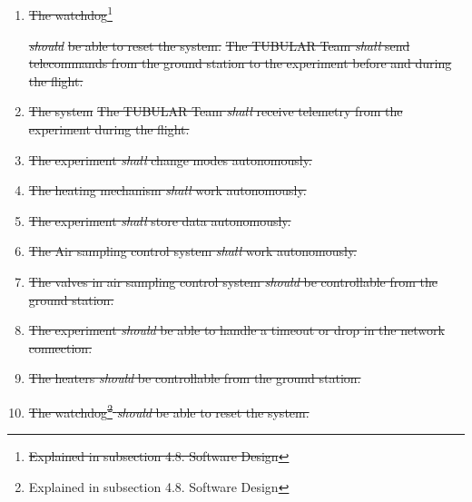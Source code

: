 \documentclass[a4paper,12pt,twoside]{article}
\providecommand{\DIFaddtex}[1]{{\protect\color{blue}\uwave{#1}}} %
\providecommand{\DIFdeltex}[1]{{\protect\color{red}\sout{#1}}}                      %
\providecommand{\DIFaddbegin}{} %
\providecommand{\DIFaddend}{} %
\providecommand{\DIFdelbegin}{} %
\providecommand{\DIFdelend}{} %
\providecommand{\DIFadd}[1]{\texorpdfstring{\DIFaddtex{#1}}{#1}} %
\providecommand{\DIFdel}[1]{\texorpdfstring{\DIFdeltex{#1}}{}} %
\newcommand{\DIFscaledelfig}{0.5}
\newlength{\DIFdelgraphicswidth} %
\newlength{\DIFdelgraphicsheight} %
\newcommand{\DIFaddincludegraphics}[2][]{{\color{blue}\fbox{\DIFOincludegraphics[#1]{#2}}}} %
\newcommand{\DIFdelincludegraphics}[2][]{%
\sbox{\DIFdelgraphicsbox}{\DIFOincludegraphics[#1]{#2}}%
\settoboxwidth{\DIFdelgraphicswidth}{\DIFdelgraphicsbox} %
\settoboxtotalheight{\DIFdelgraphicsheight}{\DIFdelgraphicsbox} %
\scalebox{\DIFscaledelfig}{%
\parbox[b]{\DIFdelgraphicswidth}{\usebox{\DIFdelgraphicsbox}\\[-\baselineskip] \rule{\DIFdelgraphicswidth}{0em}}\llap{\resizebox{\DIFdelgraphicswidth}{\DIFdelgraphicsheight}{%
\setlength{\unitlength}{\DIFdelgraphicswidth}%
\begin{picture}(1,1)%
\thicklines\linethickness{2pt} %
{\color[rgb]{1,0,0}\put(0,0){\framebox(1,1){}}}%
{\color[rgb]{1,0,0}\put(0,0){\line( 1,1){1}}}%
{\color[rgb]{1,0,0}\put(0,1){\line(1,-1){1}}}%
\end{picture}%
}\hspace*{3pt}}} %
} %
\DeclareRobustCommand{\DIFaddbegin}{\DIFOaddbegin \let\includegraphics\DIFaddincludegraphics} %
\DeclareRobustCommand{\DIFaddend}{\DIFOaddend \let\includegraphics\DIFOincludegraphics} %
\DeclareRobustCommand{\DIFdelbegin}{\DIFOdelbegin \let\includegraphics\DIFdelincludegraphics} %
\DeclareRobustCommand{\DIFdelend}{\DIFOaddend \let\includegraphics\DIFOincludegraphics} %
\begin{document}
\subsection{\DIFadd{Operational Requirements}}

\begin{enumerate}[label=O.\arabic*]
    \DIFaddend \item \DIFdelbegin \DIFdel{The watchdog}\footnote{\DIFdel{Explained in subsection 4.8. Software Design}} %
\addtocounter{footnote}{-1}%
\textit{\DIFdel{should}} %
\DIFdel{be able to reset the system.
    }\DIFdelend \DIFaddbegin \st{The TUBULAR Team \textit{shall} send telecommands from the ground station to the experiment before and during the flight.}\DIFadd{\textsuperscript{\ref{fn:unnecessary-requirement}}
    }\DIFaddend \item \DIFdelbegin \DIFdel{The system }\DIFdelend \DIFaddbegin \st{The TUBULAR Team \textit{shall} receive telemetry from the experiment during the flight.}\DIFadd{\textsuperscript{\ref{fn:unnecessary-requirement}}
    }\item \st{The experiment \textit{shall} change modes autonomously.}\DIFadd{\textsuperscript{\ref{fn:unnecessary-requirement}}
    }\item \st{The heating mechanism \textit{shall} work autonomously.}\DIFadd{\textsuperscript{\ref{fn:unnecessary-requirement}}
    }\item \st{The experiment \textit{shall} store data autonomously.}\DIFadd{\textsuperscript{\ref{fn:unnecessary-requirement}}
    }\item \st{The Air sampling control system \textit{shall} work autonomously.}\DIFadd{\textsuperscript{\ref{fn:unnecessary-requirement}}
    }\item \st{The valves in air sampling control system \textit{should} be controllable from the ground station.}\DIFadd{\textsuperscript{\ref{fn:unnecessary-requirement}}
    }\item \st{The experiment \textit{should} be able to handle a timeout or drop in the network connection.}\DIFadd{\textsuperscript{\ref{fn:unnecessary-requirement}}
    }\item \st{The heaters \textit{should} be controllable from the ground station.}\DIFadd{\textsuperscript{\ref{fn:unnecessary-requirement}}
    }\item \st{The watchdog\footnote{Explained in subsection 4.8. Software Design} \textit{should} be able to reset the system.}\DIFadd{\textsuperscript{\ref{fn:unnecessary-requirement}}
}
\end{enumerate}
\end{document}
